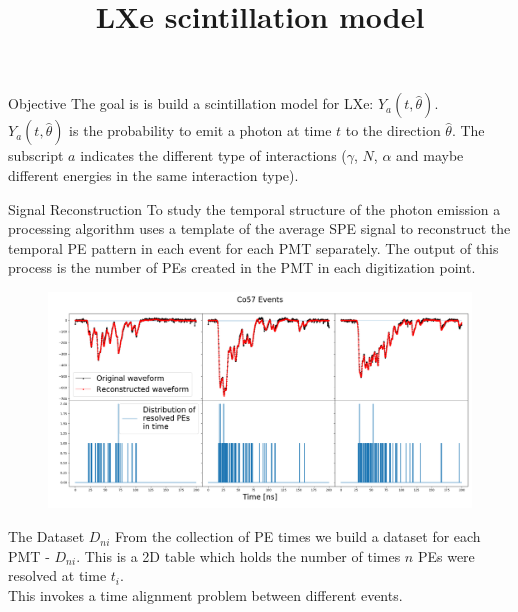 \documentclass{beamer}
\title{LXe scintillation model}
\begin{document}
{ 
\frame{\titlepage}}

\begin{frame}{Objective}
The goal is is build a scintillation model for LXe: $Y_{a}(t,\hat{\theta})$.\\
$Y_{a}(t,\hat{\theta})$ is the probability to emit a photon at time $t$ to the direction $\hat{\theta}$. The subscript $a$ indicates the different type of interactions ($\gamma$, $N$, $\alpha$ and maybe different energies in the same interaction type).\\
\end{frame}


\begin{frame}{Signal Reconstruction}
To study the temporal structure of the photon emission a processing algorithm uses a template of the average SPE signal to reconstruct the temporal PE pattern in each event for each PMT separately. The output of this process is the number of PEs created in the PMT in each digitization point.

\begin{figure}[h]
\includegraphics[width=1\textwidth]{recons.png}
\end{figure}
\end{frame}

\begin{frame}{The Dataset $D_{ni}$}
From the collection of PE times we build a dataset for each PMT - $D_{ni}$. This is a 2D table which holds the number of times $n$ PEs were resolved at time $t_i$.\\
This invokes a time alignment problem between different events.


\end{frame}
\end{document}
